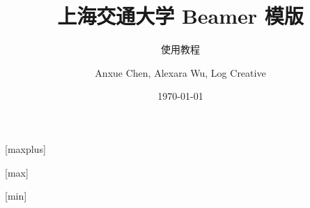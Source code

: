 \documentclass[aspectratio=169]{ctexbeamer}
\begin{document}
    \title[SJTU Beamer Template] %
    {\textbf{上海交通大学 Beamer 模版}} %

    \subtitle{使用教程}

    \author[Anxue Chen, Alexara Wu, Log Creative]
    {Anxue Chen, Alexara Wu, Log Creative}


    \date{\today}


    [maxplus]
    \maketitle
    \makebottom

    [max]
    \maketitle
    \makebottom

    [min]
    \maketitle
    \makebottom
\end{document}
